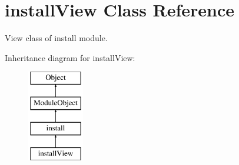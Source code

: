 \hypertarget{classinstallView}{}\section{install\+View Class Reference}
\label{classinstallView}


View class of install module.  


Inheritance diagram for install\+View\+:\begin{figure}[H]
\begin{center}
\leavevmode
\includegraphics[height=4.000000cm]{classinstallView}
\end{center}
\end{figure}
